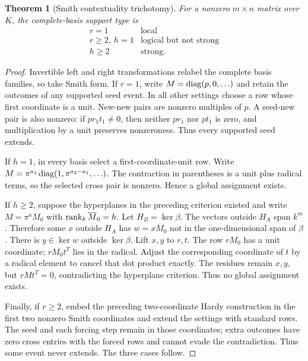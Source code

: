 \documentclass[11pt]{article}
\newtheorem{theorem}{Theorem}[section]
\theoremstyle{remark}
\begin{document}
\begin{theorem}[Smith contextuality trichotomy]
For a nonzero $m\times n$ matrix over $K$, the complete-basis support type is
\[
\begin{array}{c|c}
 r=1 & \text{local}\\
 r\geq2,\ h=1 & \text{logical but not strong}\\
 h\geq2 & \text{strong}.
\end{array}
\]
\end{theorem}
\begin{proof}
Invertible left and right transformations relabel the complete basis families,
so take Smith form. If $r=1$, write $M=\operatorname{diag}(p,0,\ldots)$ and retain the
outcomes of any supported seed event. In all other settings choose a row whose
first coordinate is a unit. New-new pairs are nonzero multiples of $p$.
A seed-new pair is also nonzero: if $pr_1t_1\ne0$, then neither $pr_1$ nor
$pt_1$ is zero, and multiplication by a unit preserves nonzeroness. Thus every
supported seed extends.

If $h=1$, in every basis select a first-coordinate-unit row. Write
$M=\pi^{a_1}\operatorname{diag}(1,\pi^{a_2-a_1},\ldots)$. The contraction in parentheses
is a unit plus radical terms, so the selected cross pair is nonzero. Hence a
global assignment exists.

If $h\geq2$, suppose the hyperplanes in the preceding criterion existed and
write $M=\pi^a M_0$ with $\operatorname{rank}_k\overline M_0=h$. Let $H_B=\ker\beta$.
The vectors outside $H_A$ span $k^m$. Therefore some $x$ outside $H_A$ has
$w=x\overline M_0$ not in the one-dimensional span of $\beta$. There is
$y\in\ker w$ outside $\ker\beta$. Lift $x,y$ to $r,t$. The row $rM_0$ has a
unit coordinate; $rM_0t^T$ lies in the radical. Adjust the corresponding
coordinate of $t$ by a radical element to cancel that dot product exactly.
The residues remain $x,y$, but $rMt^T=0$, contradicting the hyperplane
criterion. Thus no global assignment exists.

Finally, if $r\geq2$, embed the preceding two-coordinate Hardy construction
in the first two nonzero Smith coordinates and extend the settings with
standard rows. The seed and each forcing step remain in those coordinates;
extra outcomes have zero cross entries with the forced rows and cannot evade
the contradiction. Thus some event never extends. The three cases follow.
\end{proof}
\end{document}
